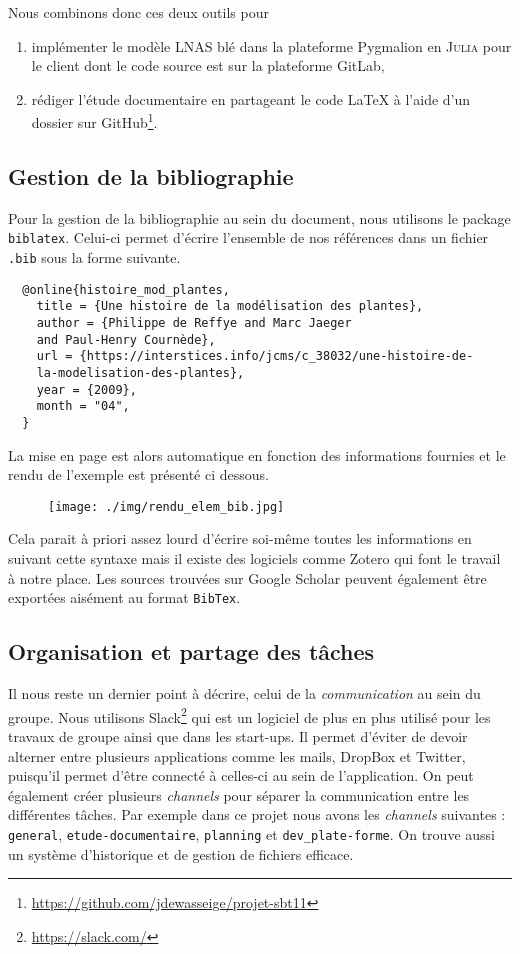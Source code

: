 Nous combinons donc ces deux outils pour 
\begin{enumerate}
  \item implémenter le modèle LNAS blé dans la plateforme
  Pygmalion en \textsc{Julia} %
  pour le client dont le code source est sur la plateforme GitLab,
  \item rédiger l'étude documentaire en partageant le code \LaTeX{}
  à l'aide d'un dossier sur 
  GitHub\footnote{\url{https://github.com/jdewasseige/projet-sbt11}}.
\end{enumerate}


\subsection{Gestion de la bibliographie}
Pour la gestion de la bibliographie au sein du document,
nous utilisons le package \texttt{biblatex}.
Celui-ci permet d'écrire l'ensemble de nos références dans un fichier \texttt{.bib}
sous la forme suivante.
\begin{verbatim}
  @online{histoire_mod_plantes,
    title = {Une histoire de la modélisation des plantes},
    author = {Philippe de Reffye and Marc Jaeger 
    and Paul-Henry Cournède},
    url = {https://interstices.info/jcms/c_38032/une-histoire-de-
    la-modelisation-des-plantes},
    year = {2009},
    month = "04",
  }
\end{verbatim}
La mise en page est alors automatique en fonction des informations fournies
et le rendu de l'exemple est présenté ci dessous.
\begin{figure}[h]
  \texttt{[image: ./img/rendu\_elem\_bib.jpg]}
\end{figure}

Cela parait à priori assez lourd d'écrire soi-même toutes les informations
en suivant cette syntaxe mais il existe des logiciels comme Zotero
qui font le travail à notre place.
Les sources trouvées sur Google Scholar peuvent également être exportées
aisément au format \texttt{BibTex}.

\subsection{Organisation et partage des tâches}
Il nous reste un dernier point à décrire, celui de la \emph{communication}
au sein du groupe.
Nous utilisons Slack\footnote{\url{https://slack.com/}} qui est un logiciel
de plus en plus utilisé pour les travaux de groupe ainsi que dans les start-ups.
Il permet d'éviter de devoir alterner entre plusieurs applications comme les mails,
DropBox et Twitter, puisqu'il permet d'être connecté
à celles-ci au sein de l'application.
On peut également créer plusieurs \emph{channels} pour séparer la communication
entre les différentes tâches.
Par exemple dans ce projet nous avons les \emph{channels} suivantes :
\texttt{general}, \texttt{etude-documentaire}, 
\texttt{planning} et \texttt{dev\_plate-forme}.
On trouve aussi un système d'historique et de gestion de fichiers efficace.

